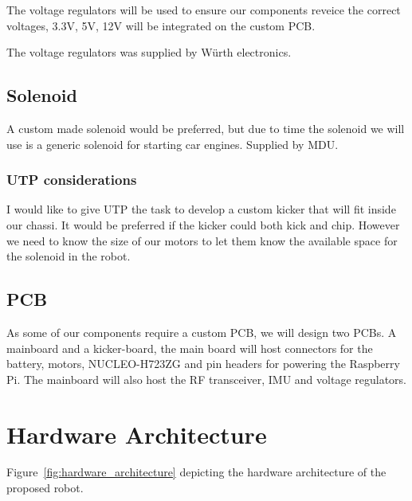 \documentclass[a4paper,8pt]{article}
\begin{document}
  The voltage regulators will be used to ensure our components reveice
  the correct voltages, 3.3V, 5V, 12V will be integrated on the custom
  PCB.

  The voltage regulators was supplied by Würth electronics.

  \subsection{Solenoid}

  A custom made solenoid would be preferred, but due to time the
  solenoid we will use is a generic solenoid for starting car engines.
  Supplied by MDU.

  \subsubsection{UTP considerations}

  I would like to give UTP the task to develop a custom kicker that will fit inside our chassi. It would be preferred if the kicker could both kick and chip. However we need to know the size of our motors to let them know the available space for the solenoid in the robot.

  \subsection{PCB}

  As some of our components require a custom PCB, we will design two
  PCBs. A mainboard and a kicker-board, the main board will host
  connectors for the battery, motors, NUCLEO-H723ZG and pin headers for
  powering the Raspberry Pi. The mainboard will also host the RF
  transceiver, IMU and voltage regulators.

  \section{Hardware Architecture}

  Figure\Figure~\ref{fig:hardware_architecture} depicting the hardware
  architecture of the proposed robot.
\end{document}
